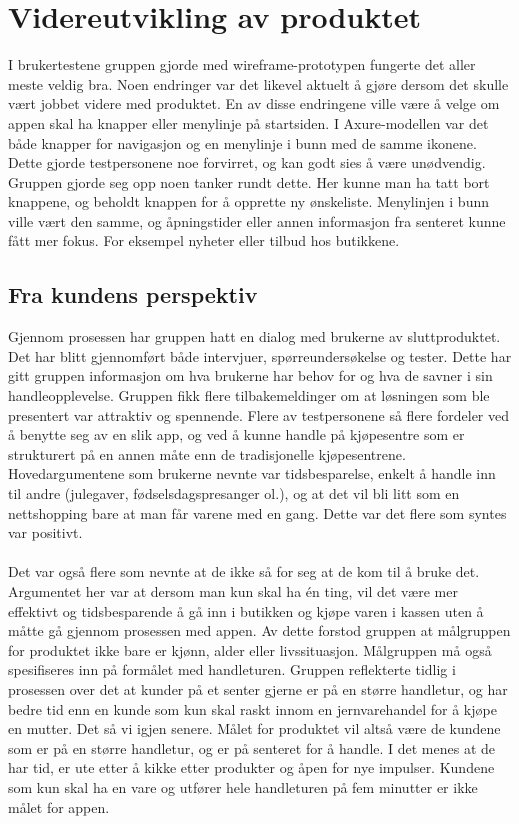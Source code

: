 \section{\textcolor[HTML]{D32F2F}{Videreutvikling av produktet}}
\label{videre}

I brukertestene gruppen gjorde med wireframe-prototypen fungerte det aller meste veldig bra. Noen endringer var det likevel aktuelt å gjøre dersom det skulle vært jobbet videre med produktet. En av disse endringene ville være å velge om appen skal ha knapper eller menylinje på startsiden. I Axure-modellen var det både knapper for navigasjon og en menylinje i bunn med de samme ikonene. Dette gjorde testpersonene noe forvirret, og kan godt sies å være unødvendig. Gruppen gjorde seg opp noen tanker rundt dette. Her kunne man ha tatt bort knappene, og beholdt knappen for å opprette ny ønskeliste. Menylinjen i bunn ville vært den samme, og åpningstider eller annen informasjon fra senteret kunne fått mer fokus. For eksempel nyheter eller tilbud hos butikkene.


\subsection{Fra kundens perspektiv}
Gjennom prosessen har gruppen hatt en dialog med brukerne av sluttproduktet. Det har blitt gjennomført både intervjuer, spørreundersøkelse og tester. Dette har gitt gruppen informasjon om hva brukerne har behov for og hva de savner i sin handleopplevelse. Gruppen fikk flere tilbakemeldinger om at løsningen som ble presentert var attraktiv og spennende. Flere av testpersonene så flere fordeler ved å benytte seg av en slik app, og ved å kunne handle på kjøpesentre som er strukturert på en annen måte enn de tradisjonelle kjøpesentrene. Hovedargumentene som brukerne nevnte var tidsbesparelse, enkelt å handle inn til andre (julegaver, fødselsdagspresanger ol.), og at det vil bli litt som en nettshopping bare at man får varene med en gang. Dette var det flere som syntes var positivt.
\\\\
Det var også flere som nevnte at de ikke så for seg at de kom til å bruke det. Argumentet her var at dersom man kun skal ha én ting, vil det være mer effektivt og tidsbesparende å gå inn i butikken og kjøpe varen i kassen uten å måtte gå gjennom prosessen med appen. Av dette forstod gruppen at målgruppen for produktet ikke bare er kjønn, alder eller livssituasjon. Målgruppen må også spesifiseres inn på formålet med handleturen. Gruppen reflekterte tidlig i prosessen over det at kunder på et senter gjerne er på en større handletur, og har bedre tid enn en kunde som kun skal raskt innom en jernvarehandel for å kjøpe en mutter. Det så vi igjen senere. Målet for produktet vil altså være de kundene som er på en større handletur, og er på senteret for å handle. I det menes at de har tid, er ute etter å kikke etter produkter og åpen for nye impulser. Kundene som kun skal ha en vare og utfører hele handleturen på fem minutter er ikke målet for appen.

